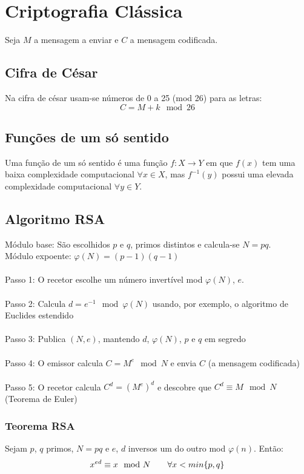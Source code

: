 \documentclass[10pt,a4paper]{report}
\begin{document}
\section{Criptografia Clássica}
Seja $M$ a mensagem a enviar e $C$ a mensagem codificada.\\
\subsection{Cifra de César}
Na cifra de césar usam-se números de 0 a 25 (mod 26) para as letras:
$$
C = M + k \mod 26
$$
\subsection{Funções de um só sentido}
Uma função de um só sentido é uma função $f: X \rightarrow Y$ em que $f(x)$ tem uma baixa complexidade computacional $\forall x \in X$, mas $f^{-1}(y)$ possui uma elevada complexidade computacional $\forall y \in Y$.
\subsection{Algoritmo RSA}
Módulo base: São escolhidos $p$ e $q$, primos distintos e calcula-se $N = pq$.\\
Módulo expoente: $\varphi(N) = (p - 1)(q - 1)$\\
\\
Passo 1: O recetor escolhe um número invertível mod $\varphi(N)$, $e$.\\
\\
Passo 2: Calcula $d = e^{-1} \mod \varphi(N)$ usando, por exemplo, o algoritmo de Euclides estendido\\
\\
Passo 3: Publica $(N,e)$, mantendo $d$, $\varphi(N)$, $p$ e $q$ em segredo\\
\\
Passo 4: O emissor calcula $C = M^e \mod N$ e envia $C$ (a mensagem codificada)\\
\\
Passo 5: O recetor calcula $C^d = (M^e)^d$ e descobre que $C^d \equiv M \mod N$ (Teorema de Euler)
\subsubsection{Teorema RSA}
Sejam $p$, $q$ primos, $N = pq$ e $e$, $d$ inversos um do outro mod $\varphi(n)$. Então:
$$
x^{ed} \equiv x \mod N \hspace{0.7cm} \forall x < min\{p,q\}
$$
\end{document}
